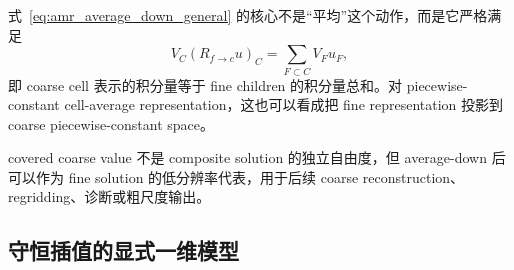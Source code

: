 式~\eqref{eq:amr_average_down_general} 的核心不是“平均”这个动作，而是它严格满足
\begin{equation}
V_C(R_{f\rightarrow c}u)_C
=
\sum_{F\subset C}V_Fu_F,
\label{eq:amr-average-down-conservation}
\end{equation}
即 coarse cell 表示的积分量等于 fine children 的积分量总和。对 piecewise-constant cell-average representation，这也可以看成把 fine representation 投影到 coarse piecewise-constant space。

covered coarse value 不是 composite solution 的独立自由度，但 average-down 后可以作为 fine solution 的低分辨率代表，用于后续 coarse reconstruction、regridding、诊断或粗尺度输出。

\subsection{守恒插值的显式一维模型}

